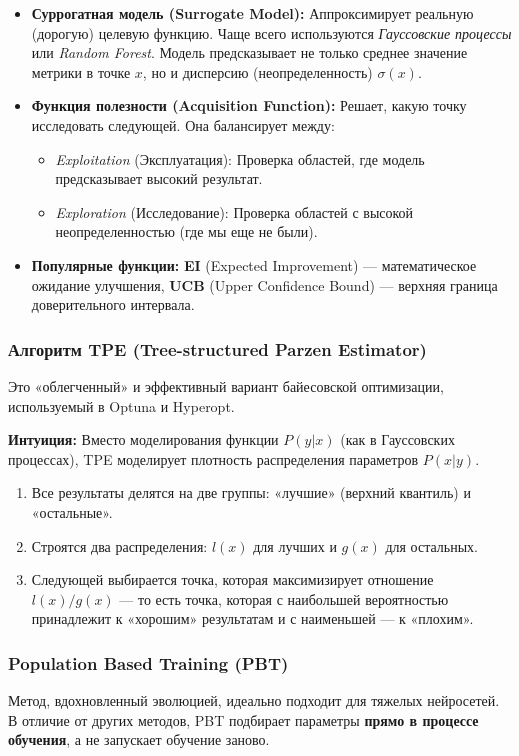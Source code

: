 \documentclass[12pt]{article}
\begin{document}
\begin{itemize}
    \item \textbf{Суррогатная модель (Surrogate Model):} Аппроксимирует реальную (дорогую) целевую функцию. Чаще всего используются \textit{Гауссовские процессы} или \textit{Random Forest}. Модель предсказывает не только среднее значение метрики в точке $x$, но и дисперсию (неопределенность) $\sigma(x)$.
    \item \textbf{Функция полезности (Acquisition Function):} Решает, какую точку исследовать следующей. Она балансирует между:
    \begin{itemize}
        \item \textit{Exploitation} (Эксплуатация): Проверка областей, где модель предсказывает высокий результат.
        \item \textit{Exploration} (Исследование): Проверка областей с высокой неопределенностью (где мы еще не были).
    \end{itemize}
    \item \textbf{Популярные функции:} \textbf{EI} (Expected Improvement) — математическое ожидание улучшения, \textbf{UCB} (Upper Confidence Bound) — верхняя граница доверительного интервала.
\end{itemize}

\subsubsection{Алгоритм TPE (Tree-structured Parzen Estimator)}
Это «облегченный» и эффективный вариант байесовской оптимизации, используемый в Optuna и Hyperopt. 

\textbf{Интуиция:} Вместо моделирования функции $P(y|x)$ (как в Гауссовских процессах), TPE моделирует плотность распределения параметров $P(x|y)$. 
\begin{enumerate}
    \item Все результаты делятся на две группы: «лучшие» (верхний квантиль) и «остальные».
    \item Строятся два распределения: $l(x)$ для лучших и $g(x)$ для остальных.
    \item Следующей выбирается точка, которая максимизирует отношение $l(x)/g(x)$ — то есть точка, которая с наибольшей вероятностью принадлежит к «хорошим» результатам и с наименьшей — к «плохим».
\end{enumerate}

\subsubsection{Population Based Training (PBT)}
Метод, вдохновленный эволюцией, идеально подходит для тяжелых нейросетей. В отличие от других методов, PBT подбирает параметры \textbf{прямо в процессе обучения}, а не запускает обучение заново.
\end{document}
